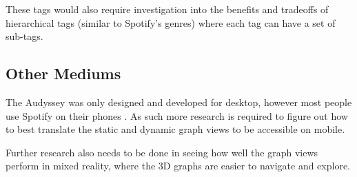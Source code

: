 These tags would also require investigation into the benefits and tradeoffs of hierarchical tags (similar to Spotify's genres) where each tag can have a set of sub-tags.


\subsection{Other Mediums}
The Audyssey was only designed and developed for desktop, however most people use Spotify on their phones \cite{}. As such more research is required to figure out how to best translate the static and dynamic graph views to be accessible on mobile.

Further research also needs to be done in seeing how well the graph views perform in mixed reality, where the 3D graphs are easier to navigate and explore.